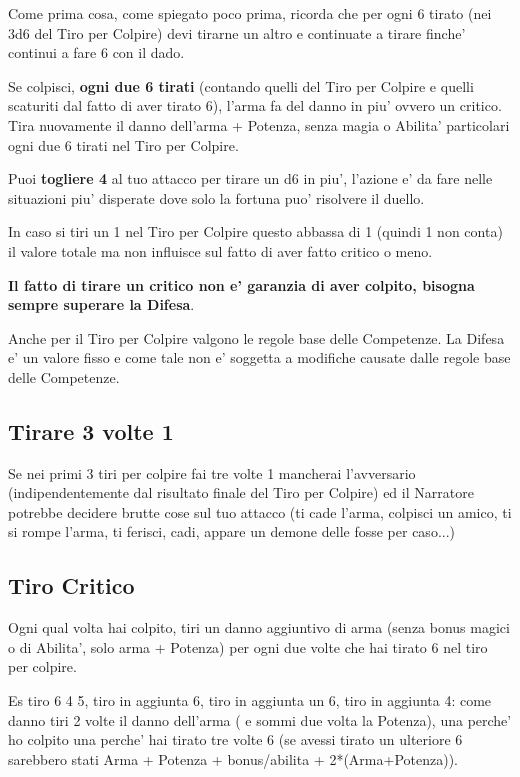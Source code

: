 \documentclass[a4paper,11pt,twoside,openany]{book}
\begin{document}
	Come prima cosa, come spiegato poco prima, ricorda che per ogni 6 tirato (nei 3d6 del Tiro per Colpire) devi tirarne un altro e continuate a tirare finche' continui a fare 6 con il dado.
	
	Se colpisci, \textbf{ogni due 6 tirati} (contando quelli del Tiro per Colpire e quelli scaturiti dal fatto di aver tirato 6), l'arma fa del danno in piu' ovvero un critico. Tira nuovamente il danno dell'arma + Potenza, senza magia o Abilita' particolari ogni due 6 tirati nel Tiro per Colpire.
	
	Puoi \textbf{togliere 4} al tuo attacco per tirare un d6 in piu', l'azione e' da fare nelle situazioni piu' disperate dove solo la fortuna puo' risolvere il duello.
	
	In caso si tiri un 1 nel Tiro per Colpire questo abbassa di 1 (quindi 1 non conta) il valore totale ma non influisce sul fatto di aver fatto critico o meno.
	
	\textbf{Il fatto di tirare un critico non e' garanzia di aver colpito,
		bisogna sempre superare la Difesa}.
	
	Anche per il Tiro per Colpire valgono le regole base delle Competenze.
	La Difesa e' un valore fisso e come tale non e' soggetta a modifiche
	causate dalle regole base delle Competenze.
	
	\subsection{Tirare 3 volte 1}
	
	Se nei primi 3 tiri per colpire fai tre volte 1 mancherai l'avversario (indipendentemente dal risultato finale del Tiro per Colpire) ed il Narratore potrebbe decidere brutte cose sul tuo attacco (ti cade l'arma, colpisci un amico, ti si rompe l'arma, ti ferisci, cadi, appare un demone delle fosse per caso...)
	
	\subsection{Tiro Critico}
	
	Ogni qual volta hai colpito, tiri un danno aggiuntivo di arma (senza bonus magici o di Abilita', solo arma + Potenza) per ogni due volte che hai tirato 6 nel tiro per colpire.
	
	Es tiro 6 4 5, tiro in aggiunta 6, tiro in aggiunta un 6, tiro in aggiunta 4: come danno tiri 2 volte il danno dell'arma ( e sommi due volta la Potenza), una perche' ho colpito una perche' hai tirato tre volte 6 (se avessi tirato un ulteriore 6 sarebbero stati Arma + Potenza + bonus/abilita + 2{*}(Arma+Potenza)).
	
\end{document}
